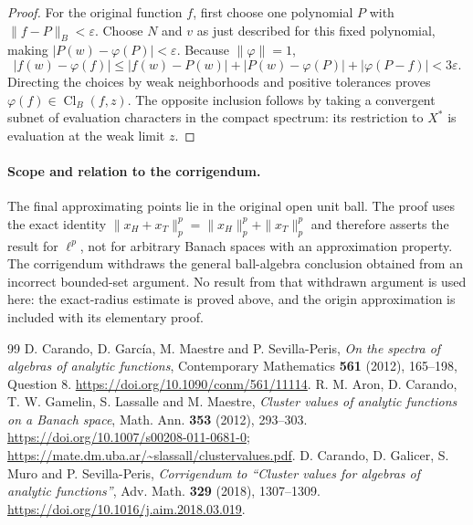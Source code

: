 \documentclass[11pt,a4paper]{article}
\theoremstyle{remark}
\begin{document}
\begin{proof}
For the original function $f$, first choose one polynomial $P$ with
$\|f-P\|_B<\varepsilon$.  Choose $N$ and $v$ as just described for
this fixed polynomial, making
$|P(w)-\varphi(P)|<\varepsilon$.
Because $\|\varphi\|=1$,
\[
 |f(w)-\varphi(f)|
 \le |f(w)-P(w)|+|P(w)-\varphi(P)|
       +|\varphi(P-f)|<3\varepsilon.
\]
Directing the choices by weak neighborhoods and positive tolerances
proves $\varphi(f)\in\operatorname{Cl}_B(f,z)$.
The opposite inclusion follows by taking a convergent subnet of
evaluation characters in the compact spectrum: its restriction to
$X^*$ is evaluation at the weak limit $z$.
\end{proof}

\paragraph{Scope and relation to the corrigendum.}
The final approximating points lie in the original open unit ball.
The proof uses the exact identity
$\|x_H+x_T\|_p^p=\|x_H\|_p^p+\|x_T\|_p^p$ and therefore asserts
the result for $\ell^p$, not for arbitrary Banach spaces with an
approximation property.
The corrigendum \cite{CarandoGalicerMuroSevillaPeris2018Corrigendum}
withdraws the general ball-algebra conclusion obtained from an
incorrect bounded-set argument.  No result from that withdrawn
argument is used here: the exact-radius estimate is proved above,
and the origin approximation is included with its elementary proof.


\begingroup\small
\begin{thebibliography}{99}
 D. Carando, D. Garc\'ia, M. Maestre and P. Sevilla-Peris, \emph{On the spectra of algebras of analytic functions}, Contemporary Mathematics \textbf{561} (2012), 165--198, Question 8. \url{https://doi.org/10.1090/conm/561/11114}.
 R. M. Aron, D. Carando, T. W. Gamelin, S. Lassalle and M. Maestre, \emph{Cluster values of analytic functions on a Banach space}, Math. Ann. \textbf{353} (2012), 293--303. \url{https://doi.org/10.1007/s00208-011-0681-0}; \url{https://mate.dm.uba.ar/~slassall/clustervalues.pdf}.
 D. Carando, D. Galicer, S. Muro and P. Sevilla-Peris, \emph{Corrigendum to ``Cluster values for algebras of analytic functions''}, Adv. Math. \textbf{329} (2018), 1307--1309. \url{https://doi.org/10.1016/j.aim.2018.03.019}.
\end{thebibliography}
\endgroup
\end{document}
